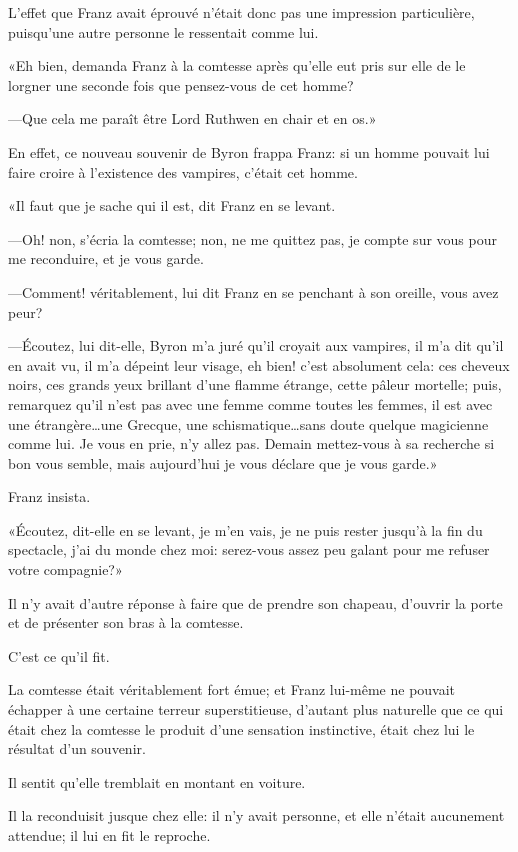 L'effet que Franz avait éprouvé n'était donc pas une impression particulière, puisqu'une autre personne le ressentait comme lui. 

«Eh bien, demanda Franz à la comtesse après qu'elle eut pris sur elle de le lorgner une seconde fois que pensez-vous de cet homme? 

—Que cela me paraît être Lord Ruthwen en chair et en os.» 

En effet, ce nouveau souvenir de Byron frappa Franz: si un homme pouvait lui faire croire à l'existence des vampires, c'était cet homme. 

«Il faut que je sache qui il est, dit Franz en se levant. 

—Oh! non, s'écria la comtesse; non, ne me quittez pas, je compte sur vous pour me reconduire, et je vous garde. 

—Comment! véritablement, lui dit Franz en se penchant à son oreille, vous avez peur? 

—Écoutez, lui dit-elle, Byron m'a juré qu'il croyait aux vampires, il m'a dit qu'il en avait vu, il m'a dépeint leur visage, eh bien! c'est absolument cela: ces cheveux noirs, ces grands yeux brillant d'une flamme étrange, cette pâleur mortelle; puis, remarquez qu'il n'est pas avec une femme comme toutes les femmes, il est avec une étrangère\dots une Grecque, une schismatique\dots sans doute quelque magicienne comme lui. Je vous en prie, n'y allez pas. Demain mettez-vous à sa recherche si bon vous semble, mais aujourd'hui je vous déclare que je vous garde.» 

Franz insista. 

«Écoutez, dit-elle en se levant, je m'en vais, je ne puis rester jusqu'à la fin du spectacle, j'ai du monde chez moi: serez-vous assez peu galant pour me refuser votre compagnie?» 

Il n'y avait d'autre réponse à faire que de prendre son chapeau, d'ouvrir la porte et de présenter son bras à la comtesse. 

C'est ce qu'il fit. 

La comtesse était véritablement fort émue; et Franz lui-même ne pouvait échapper à une certaine terreur superstitieuse, d'autant plus naturelle que ce qui était chez la comtesse le produit d'une sensation instinctive, était chez lui le résultat d'un souvenir. 

Il sentit qu'elle tremblait en montant en voiture. 

Il la reconduisit jusque chez elle: il n'y avait personne, et elle n'était aucunement attendue; il lui en fit le reproche. 

